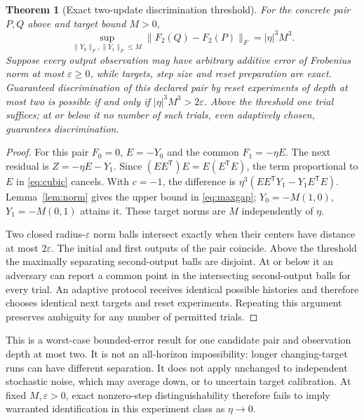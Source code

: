 \documentclass[11pt]{article}
\newtheorem{theorem}{Theorem}[section]
\theoremstyle{remark}\newtheorem{remark}[theorem]{Remark}
\begin{document}
\begin{theorem}[Exact two-update discrimination threshold]\label{thm:noise}
For the concrete pair $P,Q$ above and target bound $M>0$,
\begin{equation}\label{eq:maxgap}
 \sup_{\|Y_0\|_F,\|Y_1\|_F\leq M}
     \|F_2(Q)-F_2(P)\|_F=|\eta|^3M^3.
\end{equation}
Suppose every output observation may have arbitrary additive error of
Frobenius norm at most $\varepsilon\geq0$, while targets, step size and
reset preparation are exact. Guaranteed discrimination of this declared
pair by reset experiments of depth at most two is possible if and only if
$|\eta|^3M^3>2\varepsilon$. Above the threshold one trial suffices;
at or below it no number of such trials, even adaptively chosen, guarantees
discrimination.
\end{theorem}
\begin{proof}
For this pair $F_0=0$, $E=-Y_0$ and the common $F_1=-\eta E$.
The next residual is $Z=-\eta E-Y_1$.
Since $(EE^{\mathsf T})E=E(E^{\mathsf T}E)$, the term proportional to $E$
in \eqref{eq:cubic} cancels. With $c=-1$, the difference is
$\eta^3(EE^{\mathsf T}Y_1-Y_1E^{\mathsf T}E)$.
Lemma~\ref{lem:norm} gives the upper bound in \eqref{eq:maxgap};
$Y_0=-M(1,0)$, $Y_1=-M(0,1)$ attains it. These target norms are $M$
independently of $\eta$.

Two closed radius-$\varepsilon$ norm balls intersect exactly when their
centers have distance at most $2\varepsilon$. The initial and first
outputs of the pair coincide. Above the threshold the maximally separating
second-output balls are disjoint. At or below it an adversary can report
a common point in the intersecting second-output balls for every trial.
An adaptive protocol receives identical possible histories and therefore
chooses identical next targets and reset experiments. Repeating this
argument preserves ambiguity for any number of permitted trials.
\end{proof}
This is a worst-case bounded-error result for one candidate pair and
observation depth at most two. It is not an all-horizon impossibility:
longer changing-target runs can have different separation. It does not
apply unchanged to independent stochastic noise, which may average down,
or to uncertain target calibration. At fixed $M,\varepsilon>0$, exact
nonzero-step distinguishability therefore fails to imply warranted
identification in this experiment class as $\eta\to0$.
\end{document}
